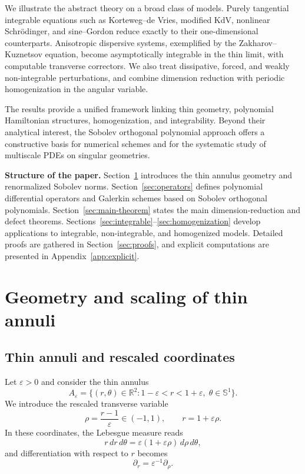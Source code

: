 \documentclass[11pt]{amsart}
\theoremstyle{plain}
\theoremstyle{definition}
\theoremstyle{remark}
\theoremstyle{remark}
\begin{document}
We illustrate the abstract theory on a broad class of models.
Purely tangential integrable equations such as Korteweg--de Vries, modified KdV, nonlinear Schr\"odinger, and sine--Gordon reduce exactly to their one-dimensional counterparts.
Anisotropic dispersive systems, exemplified by the Zakharov--Kuznetsov equation, become asymptotically integrable in the thin limit, with computable transverse correctors.
We also treat dissipative, forced, and weakly non-integrable perturbations, and combine dimension reduction with periodic homogenization in the angular variable.

The results provide a unified framework linking thin geometry, polynomial Hamiltonian structures, homogenization, and integrability.
Beyond their analytical interest, the Sobolev orthogonal polynomial approach offers a constructive basis for numerical schemes and for the systematic study of multiscale PDEs on singular geometries.

\medskip
\noindent\textbf{Structure of the paper.}
Section~\ref{sec:geometry} introduces the thin annulus geometry and renormalized Sobolev norms.
Section~\ref{sec:operators} defines polynomial differential operators and Galerkin schemes based on Sobolev orthogonal polynomials.
Section~\ref{sec:main-theorem} states the main dimension-reduction and defect theorems.
Sections~\ref{sec:integrable}--\ref{sec:homogenization} develop applications to integrable, non-integrable, and homogenized models.
Detailed proofs are gathered in Section~\ref{sec:proofs}, and explicit computations are presented in Appendix~\ref{app:explicit}.

\section{Geometry and scaling of thin annuli}
\label{sec:geometry}

\subsection{Thin annuli and rescaled coordinates}

Let $\varepsilon>0$ and consider the thin annulus
\[
A_\varepsilon
=
\bigl\{(r,\theta)\in\mathbb R^2 :
1-\varepsilon < r < 1+\varepsilon,\;
\theta\in\mathbb S^1
\bigr\}.
\]
We introduce the rescaled transverse variable
\[
\rho = \frac{r-1}{\varepsilon}\in(-1,1),
\qquad
r = 1+\varepsilon\rho.
\]
In these coordinates, the Lebesgue measure reads
\[
r\,dr\,d\theta
=
\varepsilon(1+\varepsilon\rho)\,d\rho\,d\theta,
\]
and differentiation with respect to $r$ becomes
\[
\partial_r = \varepsilon^{-1}\partial_\rho.
\]
\end{document}
